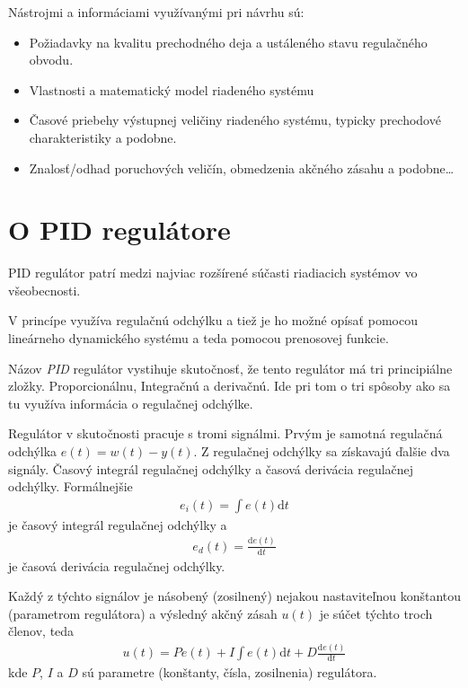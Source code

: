 \documentclass[a4paper, 10pt, ]{article}
\begin{document}
\noindent
Nástrojmi a informáciami využívanými pri návrhu sú:

\begin{itemize}[leftmargin=0pt, labelsep=4mm, itemsep=0pt]

    \item Požiadavky na kvalitu prechodného deja a ustáleného stavu regulačného obvodu.

    \item Vlastnosti a matematický model riadeného systému

    \item Časové priebehy výstupnej veličiny riadeného systému, typicky prechodové charakteristiky a podobne.

    \item Znalosť/odhad poruchových veličín, obmedzenia akčného zásahu a podobne\ldots
\end{itemize}










\section{O PID regulátore}

PID regulátor patrí medzi najviac rozšírené súčasti riadiacich systémov vo všeobecnosti.

V princípe využíva regulačnú odchýlku a tiež je ho možné opísať pomocou lineárneho dynamického systému a teda pomocou prenosovej funkcie.

Názov \emph{PID} regulátor vystihuje skutočnosť, že tento regulátor má tri principiálne zložky. Proporcionálnu, Integračnú a derivačnú. Ide pri tom o tri spôsoby ako sa tu využíva informácia o regulačnej odchýlke.

Regulátor v skutočnosti pracuje s tromi signálmi. Prvým je samotná regulačná odchýlka $e(t) = w(t) - y(t)$. Z regulačnej odchýlky sa získavajú ďalšie dva signály. Časový integrál regulačnej odchýlky a časová derivácia regulačnej odchýlky. Formálnejšie
\begin{align}
    e_i(t) = \int e(t) \text{d}t
\end{align}
je časový integrál regulačnej odchýlky a
\begin{align}
    e_d(t) = \frac{\text{d}e(t)}{\text{d}t}
\end{align}
je časová derivácia regulačnej odchýlky.

Každý z týchto signálov je násobený (zosilnený) nejakou nastaviteľnou konštantou (parametrom regulátora) a výsledný akčný zásah $u(t)$ je súčet týchto troch členov, teda
\begin{align}
    u(t) = P e(t) + I  \int e(t) \text{d}t + D  \frac{\text{d}e(t)}{\text{d}t}
\end{align}
kde $P$, $I$ a $D$ sú parametre (konštanty, čísla, zosilnenia) regulátora.
\end{document}
